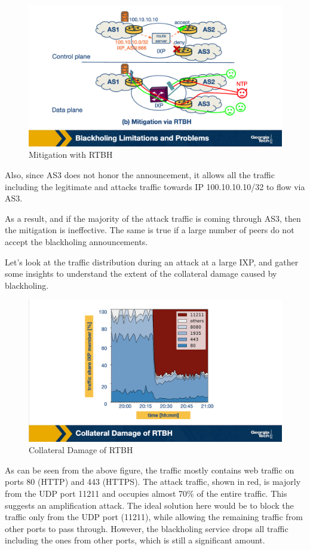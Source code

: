 \documentclass[11pt]{article}
\begin{document}
\begin{figure}[htbp]
\centering
\includegraphics[width=.9\linewidth]{./MD_Figures/9_bgp_blackholing_mitigation.png}
\caption{\label{fig:org2d60aa7}Mitigation with RTBH}
\end{figure}

Also, since AS3 does not honor the announcement, it allows all the traffic including the legitimate and attacks traffic towards IP 100.10.10.10/32 to flow via AS3. 

As a result, and if the majority of the attack traffic is coming through AS3,  then the mitigation is ineffective. The same is true if a large number of peers do not accept the blackholing announcements. 

Let’s look at the traffic distribution during an attack at a large IXP, and gather some insights to understand the extent of the collateral damage caused by blackholing.

\begin{figure}[htbp]
\centering
\includegraphics[width=.9\linewidth]{./MD_Figures/9_bgp_blackholing_collateral_damage.png}
\caption{\label{fig:org54899ed}Collateral Damage of RTBH}
\end{figure}

As can be seen from the above figure, the traffic mostly contains web traffic on ports 80 (HTTP) and 443 (HTTPS). The attack traffic, shown in red, is majorly from the UDP port 11211 and occupies almost 70\% of the entire traffic. This suggests an amplification attack. The ideal solution here would be to block the traffic only from the UDP port (11211), while allowing the remaining traffic from other ports to pass through. However, the blackholing service drops all traffic including the ones from other ports, which is still a significant amount. 
\end{document}
